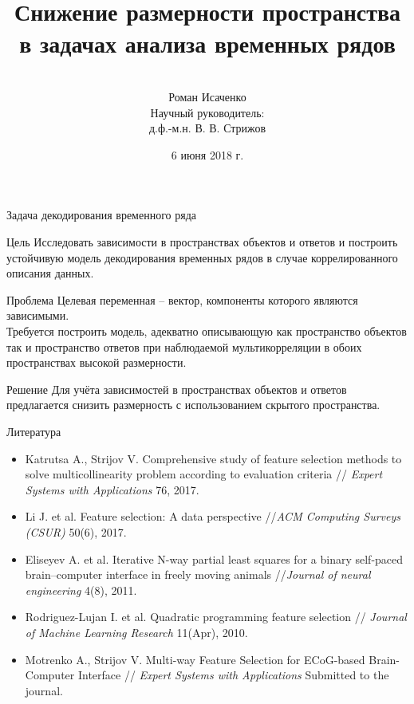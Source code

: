 \documentclass[9pt]{beamer}
\title[\hbox to 56mm{  \hfill\insertframenumber\,/\,\inserttotalframenumber}]
{\\ \vspace{1.5cm} Снижение размерности пространства \\ в задачах анализа временных рядов}
\author[Роман Исаченко]{\\ 
	\vspace{.4cm}
	Роман Исаченко \\
	\vspace{3mm}
	{\footnotesize Научный руководитель: \\
	д.ф.-м.н. В. В. Стрижов}}
\institute[МФТИ(ГУ)]{
Московский физико-технический институт\\
Факультет управления и прикладной математики\\
Кафедра <<Интеллектуальные системы>>}
\date{6 июня 2018 г.}
\begin{document}
\begin{frame}
\titlepage
\end{frame}
\begin{frame}{Задача декодирования временного ряда}
	\begin{block}{Цель}
		Исследовать зависимости в пространствах объектов и ответов и построить устойчивую модель декодирования временных рядов в случае коррелированного описания данных.
	\end{block}
	\begin{block}{Проблема}
		Целевая переменная -- вектор, компоненты которого являются зависимыми. \\
		Требуется построить модель, адекватно описывающую как пространство объектов так и пространство ответов при наблюдаемой мультикорреляции в обоих пространствах высокой размерности. 
	\end{block}
	\begin{block}{Решение}
		Для учёта зависимостей в пространствах объектов и ответов предлагается снизить размерность с использованием скрытого пространства. 
	\end{block}
\end{frame}
\begin{frame}{Литература}
	\begin{itemize}
		\item Katrutsa A., Strijov V. Comprehensive study of feature selection methods to solve multicollinearity problem according to evaluation criteria // \textit{Expert Systems with Applications} 76, 2017.
		\vfill
		\item Li J. et al. Feature selection: A data perspective //\textit{ACM Computing Surveys (CSUR)} 50(6), 2017.
		\vfill
		\item Eliseyev A. et al. Iterative N-way partial least squares for a binary self-paced brain–computer interface in freely moving animals //\textit{Journal of neural engineering} 4(8), 2011.
		\vfill
		\item Rodriguez-Lujan I. et al. Quadratic programming feature selection // \textit{Journal of Machine Learning Research} 11(Apr), 2010.
		\vfill
		\item Motrenko A., Strijov V. Multi-way Feature Selection for ECoG-based Brain-Computer Interface // \textit{Expert Systems with Applications} Submitted to the journal.
	\end{itemize}
\end{frame}
\end{document}
